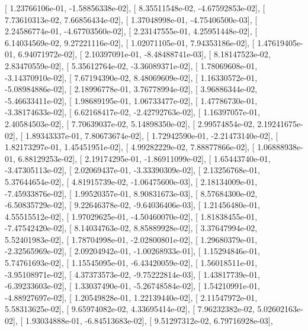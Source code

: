 \documentclass{article}
\begin{document}
       [  1.23766106e-01,  -1.58856338e-02],
       [  8.35511548e-02,  -4.67592853e-02],
       [  7.73610313e-02,   7.66856434e-02],
       [  1.37048998e-01,  -4.75406500e-03],
       [  2.24586774e-01,  -4.67703560e-02],
       [  2.23147555e-01,   4.25951448e-02],
       [  6.14034569e-02,   9.27221116e-02],
       [  1.02071105e-01,   7.94353186e-02],
       [  1.47619405e-01,   6.94071972e-02],
       [  2.10397091e-01,  -8.48488741e-03],
       [  8.18147523e-02,   2.83470559e-02],
       [  5.35612764e-02,  -3.36089371e-02],
       [  1.78069608e-01,  -3.14370910e-02],
       [  7.67194390e-02,   8.48069609e-02],
       [  1.16330572e-01,  -5.08984886e-02],
       [  2.18996778e-01,   3.76778994e-02],
       [  3.96886344e-02,  -5.46633411e-02],
       [  1.98689195e-01,   1.06733477e-02],
       [  1.47786730e-01,  -3.38174633e-02],
       [  6.62168417e-02,  -2.42792763e-02],
       [  1.16397057e-01,   2.40584503e-02],
       [  7.70639037e-02,   5.14898350e-02],
       [  2.99574854e-02,   2.19241675e-02],
       [  1.89343337e-01,   7.80673674e-02],
       [  1.72942590e-01,  -2.21473140e-02],
       [  1.82173297e-01,   1.45451951e-02],
       [  4.99282229e-02,   7.88877866e-02],
       [  1.06888938e-01,   6.88129253e-02],
       [  2.19174295e-01,  -1.86911099e-02],
       [  1.65443740e-01,  -3.47305113e-02],
       [  2.02069437e-01,  -3.33390309e-02],
       [  2.13256768e-01,   5.37644654e-02],
       [  4.81915739e-02,  -1.06475600e-03],
       [  2.18134009e-01,  -7.45933876e-02],
       [  1.99520357e-01,   8.90831673e-03],
       [  8.57684300e-02,  -6.50835729e-02],
       [  9.22646378e-02,  -9.64036406e-03],
       [  1.21456480e-01,   4.55515512e-02],
       [  1.97029625e-01,  -4.50460070e-02],
       [  1.81838455e-01,  -7.47542420e-02],
       [  8.14034763e-02,   8.85889928e-02],
       [  3.37647994e-02,   5.52401983e-02],
       [  1.78704998e-01,  -2.02800801e-02],
       [  1.29680379e-01,  -2.32565969e-02],
       [  2.09204942e-01,  -1.00268933e-01],
       [  1.15294846e-01,   5.74761693e-02],
       [  1.15545095e-01,  -6.43420059e-02],
       [  1.56018511e-01,  -3.95108971e-02],
       [  4.37373573e-02,  -9.75222814e-03],
       [  1.43817739e-01,  -6.39233603e-02],
       [  1.33037490e-01,  -5.26748584e-02],
       [  1.54210991e-01,  -4.88927697e-02],
       [  1.20549828e-01,   1.22139440e-02],
       [  2.11547972e-01,   5.58313625e-02],
       [  9.65974082e-02,   4.33695414e-02],
       [  7.96232382e-02,   5.02602163e-02],
       [  1.93034888e-01,  -6.84513683e-02],
       [  9.51297312e-02,   6.79716928e-03],
\end{document}
